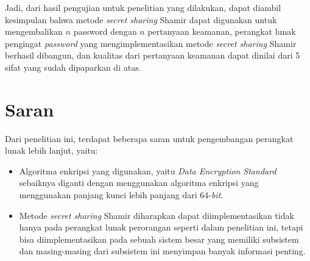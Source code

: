 Jadi, dari hasil pengujian untuk penelitian yang dilakukan, dapat diambil kesimpulan bahwa metode \textit{secret sharing} Shamir dapat digunakan untuk mengembalikan $n$ password dengan $n$ pertanyaan keamanan, perangkat lunak pengingat \textit{password} yang mengimplementasikan metode \textit{secret sharing} Shamir berhasil dibangun, dan kualitas dari pertanyaan keamanan dapat dinilai dari 5 sifat yang sudah dipaparkan di atas.

\section{Saran}

Dari penelitian ini, terdapat beberapa saran untuk pengembangan perangkat lunak lebih lanjut, yaitu:
\begin{itemize}[itemsep=0mm]
	\item Algoritma enkripsi yang digunakan, yaitu \textit{Data Encryption Standard} sebaiknya diganti dengan menggunakan algoritma enkripsi yang menggunakan panjang kunci lebih panjang dari 64-\textit{bit}.
	\item Metode \textit{secret sharing} Shamir diharapkan dapat diimplementasikan tidak hanya pada perangkat lunak perorangan seperti dalam penelitian ini, tetapi bisa diimplementasikan pada sebuah sistem besar yang memiliki subsistem dan masing-masing dari subsistem ini menyimpan banyak informasi penting.
\end{itemize}